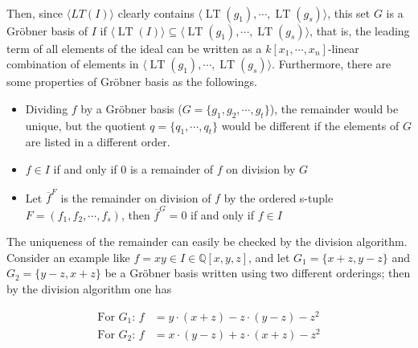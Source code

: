 \documentclass{article}
\newtheorem{corollary}{Corollary}[theorem]
\newcommand{\lt}{\ensuremath{\operatorname{LT}}}
\theoremstyle{definition}
\theoremstyle{remark}
\theoremstyle{example}
\begin{document}


\paragraph{}

Then, since $\langle LT(I)\rangle$ clearly contains $\langle \lt(g_1), \cdots, \lt(g_s) \rangle$, this set $G$ is a Gröbner basis of $I$ if $\langle \lt(I) \rangle \subseteq \langle \lt(g_1),\cdots, \lt(g_s) \rangle$, that is, the leading term of all elements of the ideal can be written as a $k[x_1, \cdots, x_n]$-linear combination of elements in $\langle \lt(g_1), \cdots, \lt(g_s) \rangle$. Furthermore, there are some properties of Gröbner basis as the followings.

\begin{itemize}
    \item Dividing $f$ by a Gröbner basis ($G = \{g_1, g_2, \cdots, g_t\}$), the remainder would be unique, but the quotient $q = \{q_1,\cdots,q_t\}$ would be different if the elements of $G$ are listed in a different order.
    \item $f \in I$ if and only if $0$ is a remainder of $f$ on division by $G$
    \item Let $\overline{f}^{F}$ is the remainder on division of $f$ by the ordered s-tuple $F = (f_1, f_2, \cdots, f_s)$, then $\overline{f}^{G} = 0$ if and only if $f \in I$
\end{itemize}

The uniqueness of the remainder can easily be checked by the division algorithm. Consider an example like $f = xy \in I \in \mathbb{Q}[x,y,z]$, and let $G_1 = \{x+z,y-z\}$ and $G_2 = \{y-z,x+z\}$ be a Gröbner basis written using two different orderings; then by the division algorithm one has

\begin{align}
        \text{For } G_1 \text{: } f &= y\cdot(x+z) - z\cdot (y-z) - z^2\\
        \text{For } G_2 \text{: } f &= x\cdot(y-z) + z\cdot (x+z) - z^2
\end{align}
\end{document}
